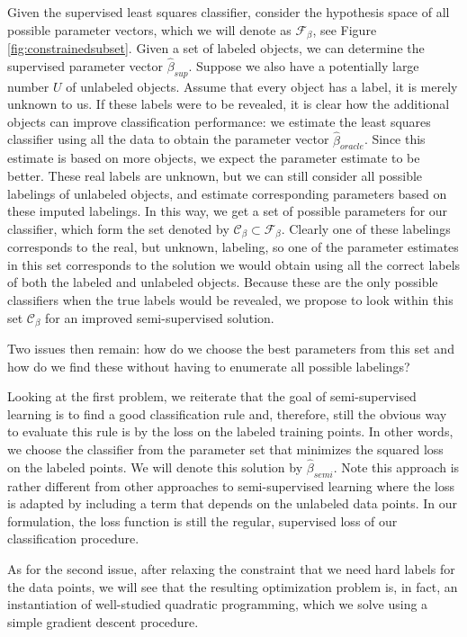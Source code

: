 \documentclass[twoside]{memoir}\usepackage[]{graphicx}\usepackage{xcolor}
\newcommand{\Cb}{\mathcal{C}_{\beta}}
\newcommand{\Nunl}{U}
\begin{document}
Given the supervised least squares classifier, consider the hypothesis space of all possible parameter vectors, which we will denote as $\mathcal{F}_{\beta}$, see Figure \ref{fig:constrainedsubset}. Given a set of labeled objects, we can determine the supervised parameter vector $\hat{\beta}_{sup}$. Suppose we also have a potentially large number $\Nunl$ of unlabeled objects. Assume that every object has a label, it is merely unknown to us. If these labels were to be revealed, it is clear how the additional objects can improve classification performance: we estimate the least squares classifier using all the data to obtain the parameter vector $\hat{\beta}_{oracle}$. Since this estimate is based on more objects, we expect the parameter estimate to be better. These real labels are unknown, but we can still consider all possible labelings of unlabeled objects, and estimate corresponding parameters based on these imputed labelings. In this way, we get a set of possible parameters for our classifier, which form the set denoted by $\Cb \subset \mathcal{F}_{\beta}$. Clearly one of these labelings corresponds to the real, but unknown, labeling, so one of the parameter estimates in this set corresponds to the solution we would obtain using all the correct labels of both the labeled and unlabeled objects. Because these are the only possible classifiers when the true labels would be revealed, we propose to look within this set $\Cb$ for an improved semi-supervised solution. 

Two issues then remain: how do we choose the best parameters from this set and how do we find these without having to enumerate all possible labelings?

Looking at the first problem, we reiterate that the goal of semi-supervised learning is to find a good classification rule and, therefore, still the obvious way to evaluate this rule is by the loss on the labeled training points. In other words, we choose the classifier from the parameter set that minimizes the squared loss on the labeled points. We will denote this solution by $\hat{\beta}_{semi}$. Note this approach is rather different from other approaches to semi-supervised learning where the loss is adapted by including a term that depends on the unlabeled data points. In our formulation, the loss function is still the regular, supervised loss of our classification procedure.

As for the second issue, after relaxing the constraint that we need hard labels for the data points, we will see that the resulting optimization problem is, in fact, an instantiation of well-studied quadratic programming, which we solve using a simple gradient descent procedure.
\end{document}
